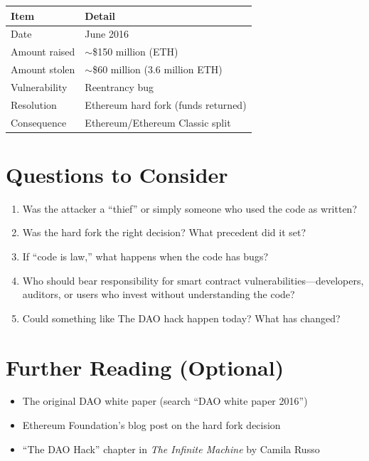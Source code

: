 \documentclass[11pt]{article}
\begin{document}
\begin{center}
\begin{tabular}{ll}
\toprule
\textbf{Item} & \textbf{Detail} \\
\midrule
Date & June 2016 \\
Amount raised & $\sim$\$150 million (ETH) \\
Amount stolen & $\sim$\$60 million (3.6 million ETH) \\
Vulnerability & Reentrancy bug \\
Resolution & Ethereum hard fork (funds returned) \\
Consequence & Ethereum/Ethereum Classic split \\
\bottomrule
\end{tabular}
\end{center}

\section*{Questions to Consider}

\begin{enumerate}[leftmargin=*]
\item Was the attacker a ``thief'' or simply someone who used the code as written?

\item Was the hard fork the right decision? What precedent did it set?

\item If ``code is law,'' what happens when the code has bugs?

\item Who should bear responsibility for smart contract vulnerabilities---developers, auditors, or users who invest without understanding the code?

\item Could something like The DAO hack happen today? What has changed?
\end{enumerate}

\section*{Further Reading (Optional)}

\begin{itemize}[leftmargin=*]
\item The original DAO white paper (search ``DAO white paper 2016'')
\item Ethereum Foundation's blog post on the hard fork decision
\item ``The DAO Hack'' chapter in \textit{The Infinite Machine} by Camila Russo
\end{itemize}
\end{document}
